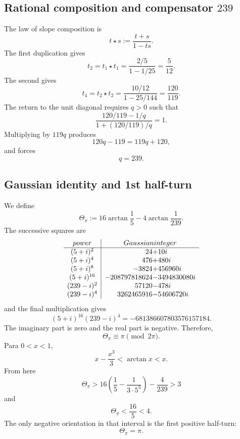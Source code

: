 \subsection{Rational composition and compensator \texorpdfstring{\(239\)}{239}}

The law of slope composition is
\[
 t\star s:=\frac{t+s}{1-ts}.
\]
The first duplication gives
\[
 t_2=t_1\star t_1
 =\frac{2/5}{1-1/25}
 =\frac5{12}.
\]
The second gives
\[
 t_4=t_2\star t_2
 =\frac{10/12}{1-25/144}
 =\frac{120}{119}.
\]
The return to the unit diagonal requires \(q>0\) such that
\[
 \frac{120/119-1/q}{1+(120/119)/q}=1.
\]
Multiplying by \(119q\) produces
\[
 120q-119=119q+120,
\]
and forces
\begin{equation}
 \boxed{q=239.}
 \label{p12-83-c9-s1:eq:compensador-239-pi}
\end{equation}

\subsection{Gaussian identity and 1st half-turn}

We define
\begin{equation}
 \Theta_\pi
 :=16\arctan\frac15-4\arctan\frac1{239}.
 \label{p12-83-c9-s1:eq:theta-pi-autonoma}
\end{equation}
The successive squares are
\[
\begin{array}{c|r@{}l}
\text{power}&\multicolumn{2}{c}{\text{Gaussian integer}}\\ \hline
(5+i)^2&24&+10i\\
(5+i)^4&476&+480i\\
(5+i)^8&-3824&+456960i\\
(5+i)^{16}&-208797818624&-3494830080i\\
(239-i)^2&57120&-478i\\
(239-i)^4&3262465916&-54606720i
\end{array}
\]
and the final multiplication gives
\begin{equation}
 \boxed{
 (5+i)^{16}(239-i)^4
 =-681386607803576157184.}
 \label{p12-83-c9-s1:eq:identidad-gaussiana-pi-autonoma}
\end{equation}
The imaginary part is zero and the real part is negative. Therefore,
\[
 \Theta_\pi\equiv\pi\pmod{2\pi}.
\]
Para \(0<x<1\),
\[
 x-\frac{x^3}{3}<\arctan x<x.
\]
From here
\[
 \Theta_\pi>
 16\left(\frac15-\frac1{3\cdot5^3}\right)-\frac4{239}>3
\]
and
\[
 \Theta_\pi<\frac{16}{5}<4.
\]
The only negative orientation in that interval is the first positive half-turn:
\begin{equation}
 \boxed{\Theta_\pi=\pi.}
 \label{p12-83-c9-s1:eq:reconocimiento-pi-exacto}
\end{equation}

